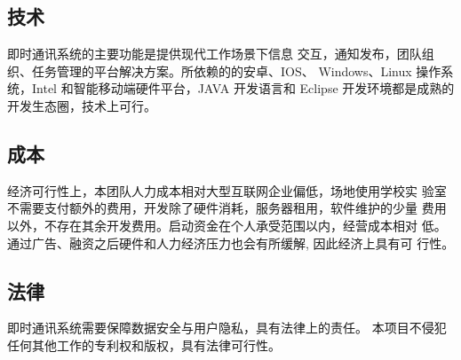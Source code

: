 \subsection{技术}
即时通讯系统的主要功能是提供现代工作场景下信息
交互，通知发布，团队组织、任务管理的平台解决方案。所依赖的的安卓、IOS、
Windows、Linux 操作系统，Intel 和智能移动端硬件平台，JAVA 开发语言和 Eclipse
开发环境都是成熟的开发生态圈，技术上可行。
\subsection{成本}
经济可行性上，本团队人力成本相对大型互联网企业偏低，场地使用学校实
验室不需要支付额外的费用，开发除了硬件消耗，服务器租用，软件维护的少量
费用以外，不存在其余开发费用。启动资金在个人承受范围以内，经营成本相对
低。通过广告、融资之后硬件和人力经济压力也会有所缓解, 因此经济上具有可
行性。
\subsection{法律}
即时通讯系统需要保障数据安全与用户隐私，具有法律上的责任。
本项目不侵犯任何其他工作的专利权和版权，具有法律可行性。
